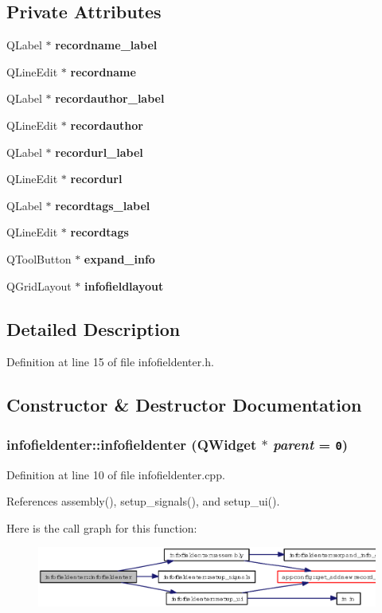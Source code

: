 \subsection*{Private Attributes}
\begin{CompactItemize}
\item 
QLabel $\ast$ {\bf recordname\_\-label}
\item 
QLine\-Edit $\ast$ {\bf recordname}
\item 
QLabel $\ast$ {\bf recordauthor\_\-label}
\item 
QLine\-Edit $\ast$ {\bf recordauthor}
\item 
QLabel $\ast$ {\bf recordurl\_\-label}
\item 
QLine\-Edit $\ast$ {\bf recordurl}
\item 
QLabel $\ast$ {\bf recordtags\_\-label}
\item 
QLine\-Edit $\ast$ {\bf recordtags}
\item 
QTool\-Button $\ast$ {\bf expand\_\-info}
\item 
QGrid\-Layout $\ast$ {\bf infofieldlayout}
\end{CompactItemize}


\subsection{Detailed Description}




Definition at line 15 of file infofieldenter.h.

\subsection{Constructor \& Destructor Documentation}
\subsubsection{\setlength{\rightskip}{0pt plus 5cm}infofieldenter::infofieldenter (QWidget $\ast$ {\em parent} = {\tt 0})}\label{classinfofieldenter_4a1d31e749d90f7d36ea594e383e05bc}




Definition at line 10 of file infofieldenter.cpp.

References assembly(), setup\_\-signals(), and setup\_\-ui().

Here is the call graph for this function:\begin{figure}[H]
\begin{center}
\leavevmode
\includegraphics[width=336pt]{classinfofieldenter_4a1d31e749d90f7d36ea594e383e05bc_cgraph}
\end{center}
\end{figure}

